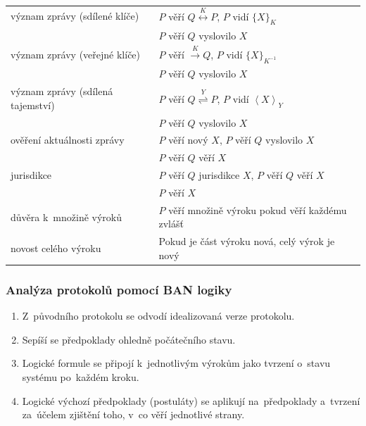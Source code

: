 \begin{tabular}{ll}
význam zprávy (sdílené klíče)
& $P$ věří $Q \stackrel{K}{\leftrightarrow} P$, $P$ vidí $\{X\}_K$ \\
& $P$ věří $Q$ vyslovilo $X$ \\
význam zprávy (veřejné klíče) & $P$ věří $\stackrel{K}{\rightarrow} Q$, $P$ vidí $\{X\}_{K^{-1}}$ \\
& $P$ věří $Q$ vyslovilo $X$ \\
význam zprávy (sdílená tajemství) & $P$ věří $Q \stackrel{Y}{\rightleftharpoons} P$, $P$ vidí $\left<X\right>_Y$ \\
& $P$ věří $Q$ vyslovilo $X$ \\

ověření aktuálnosti zprávy
& $P$ věří nový $X$, $P$ věří $Q$ vyslovilo $X$ \\
& $P$ věří $Q$ věří $X$ \\

jurisdikce
& $P$ věří $Q$ jurisdikce $X$, $P$ věří $Q$ věří $X$ \\
& $P$ věří $X$ \\

důvěra k~množině výroků
& $P$ věří množině výroku pokud věří každému zvlášť \\

novost celého výroku
& Pokud je část výroku nová, celý výrok je nový \\
\end{tabular}

\subsubsection{Analýza protokolů pomocí BAN logiky}

\begin{enumerate}
\item Z~původního protokolu se odvodí idealizovaná verze protokolu.
\item Sepíší se předpoklady ohledně počátečního stavu.
\item Logické formule se připojí k~jednotlivým výrokům jako tvrzení o~stavu systému po~každém kroku.
\item Logické výchozí předpoklady (postuláty) se aplikují na~předpoklady a~tvrzení za~účelem zjištění toho, v~co věří jednotlivé strany.
\end{enumerate}
